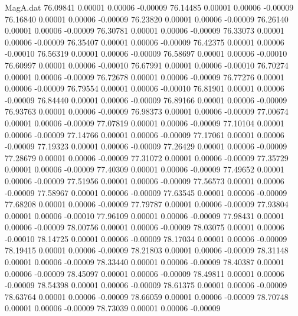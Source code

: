 \begin{filecontents}{MagA.dat}
  76.09841    0.00001    0.00006   -0.00009
  76.14485    0.00001    0.00006   -0.00009
  76.16840    0.00001    0.00006   -0.00009
  76.23820    0.00001    0.00006   -0.00009
  76.26140    0.00001    0.00006   -0.00009
  76.30781    0.00001    0.00006   -0.00009
  76.33073    0.00001    0.00006   -0.00009
  76.35407    0.00001    0.00006   -0.00009
  76.42375    0.00001    0.00006   -0.00010
  76.56319    0.00001    0.00006   -0.00009
  76.58697    0.00001    0.00006   -0.00010
  76.60997    0.00001    0.00006   -0.00010
  76.67991    0.00001    0.00006   -0.00010
  76.70274    0.00001    0.00006   -0.00009
  76.72678    0.00001    0.00006   -0.00009
  76.77276    0.00001    0.00006   -0.00009
  76.79554    0.00001    0.00006   -0.00010
  76.81901    0.00001    0.00006   -0.00009
  76.84440    0.00001    0.00006   -0.00009
  76.89166    0.00001    0.00006   -0.00009
  76.93763    0.00001    0.00006   -0.00009
  76.98373    0.00001    0.00006   -0.00009
  77.00674    0.00001    0.00006   -0.00009
  77.07819    0.00001    0.00006   -0.00009
  77.10104    0.00001    0.00006   -0.00009
  77.14766    0.00001    0.00006   -0.00009
  77.17061    0.00001    0.00006   -0.00009
  77.19323    0.00001    0.00006   -0.00009
  77.26429    0.00001    0.00006   -0.00009
  77.28679    0.00001    0.00006   -0.00009
  77.31072    0.00001    0.00006   -0.00009
  77.35729    0.00001    0.00006   -0.00009
  77.40309    0.00001    0.00006   -0.00009
  77.49652    0.00001    0.00006   -0.00009
  77.51956    0.00001    0.00006   -0.00009
  77.56573    0.00001    0.00006   -0.00009
  77.58967    0.00001    0.00006   -0.00009
  77.63545    0.00001    0.00006   -0.00009
  77.68208    0.00001    0.00006   -0.00009
  77.79787    0.00001    0.00006   -0.00009
  77.93804    0.00001    0.00006   -0.00010
  77.96109    0.00001    0.00006   -0.00009
  77.98431    0.00001    0.00006   -0.00009
  78.00756    0.00001    0.00006   -0.00009
  78.03075    0.00001    0.00006   -0.00010
  78.14725    0.00001    0.00006   -0.00009
  78.17034    0.00001    0.00006   -0.00009
  78.19415    0.00001    0.00006   -0.00009
  78.21803    0.00001    0.00006   -0.00009
  78.31148    0.00001    0.00006   -0.00009
  78.33440    0.00001    0.00006   -0.00009
  78.40387    0.00001    0.00006   -0.00009
  78.45097    0.00001    0.00006   -0.00009
  78.49811    0.00001    0.00006   -0.00009
  78.54398    0.00001    0.00006   -0.00009
  78.61375    0.00001    0.00006   -0.00009
  78.63764    0.00001    0.00006   -0.00009
  78.66059    0.00001    0.00006   -0.00009
  78.70748    0.00001    0.00006   -0.00009
  78.73039    0.00001    0.00006   -0.00009

\end{filecontents}
